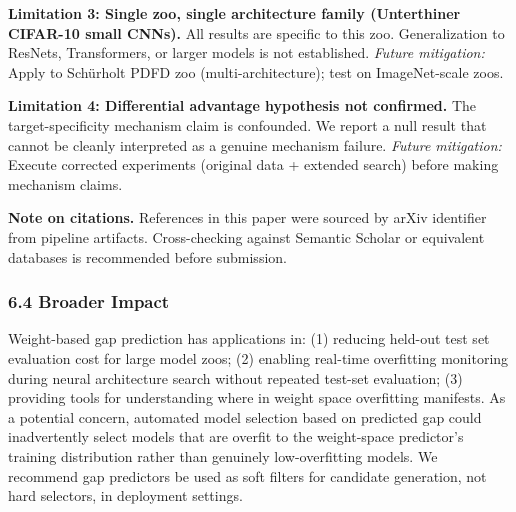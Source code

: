 \textbf{Limitation 3: Single zoo, single architecture family (Unterthiner CIFAR-10 small CNNs).}
All results are specific to this zoo. Generalization to ResNets, Transformers, or larger models is
not established.
\textit{Future mitigation:} Apply to Schürholt PDFD zoo (multi-architecture); test on ImageNet-scale zoos.

\textbf{Limitation 4: Differential advantage hypothesis not confirmed.}
The target-specificity mechanism claim is confounded. We report a null result that cannot be cleanly
interpreted as a genuine mechanism failure.
\textit{Future mitigation:} Execute corrected experiments (original data + extended search) before making
mechanism claims.

\textbf{Note on citations.} References in this paper were sourced by arXiv identifier from pipeline
artifacts. Cross-checking against Semantic Scholar or equivalent databases is recommended before
submission.

\subsubsection{6.4 Broader Impact}

Weight-based gap prediction has applications in: (1) reducing held-out test set evaluation cost
for large model zoos; (2) enabling real-time overfitting monitoring during neural architecture search
without repeated test-set evaluation; (3) providing tools for understanding where in weight space
overfitting manifests. As a potential concern, automated model selection based on predicted gap
could inadvertently select models that are overfit to the weight-space predictor's training
distribution rather than genuinely low-overfitting models. We recommend gap predictors be used
as soft filters for candidate generation, not hard selectors, in deployment settings.

